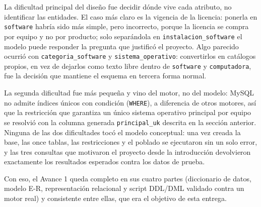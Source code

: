 \documentclass[10pt,a4paper]{article}
\begin{document}
La dificultad principal del diseño fue decidir dónde vive cada atributo, no identificar las entidades. El caso más claro es la vigencia de la licencia: ponerla en \texttt{software} habría sido más simple, pero incorrecto, porque la licencia se compra por equipo y no por producto; solo separándola en \texttt{instalacion\_software} el modelo puede responder la pregunta que justificó el proyecto. Algo parecido ocurrió con \texttt{categoria\_software} y \texttt{sistema\_operativo}: convertirlos en catálogos propios, en vez de dejarlos como texto libre dentro de \texttt{software} y \texttt{computadora}, fue la decisión que mantiene el esquema en tercera forma normal.

La segunda dificultad fue más pequeña y vino del motor, no del modelo: MySQL no admite índices únicos con condición (\texttt{WHERE}), a diferencia de otros motores, así que la restricción que garantiza un único sistema operativo principal por equipo se resolvió con la columna generada \texttt{principal\_uk} descrita en la sección anterior. Ninguna de las dos dificultades tocó el modelo conceptual: una vez creada la base, las once tablas, las restricciones y el poblado se ejecutaron sin un solo error, y las tres consultas que motivaron el proyecto desde la introducción devolvieron exactamente los resultados esperados contra los datos de prueba.

Con eso, el Avance 1 queda completo en sus cuatro partes (diccionario de datos, modelo E-R, representación relacional y script DDL/DML validado contra un motor real) y consistente entre ellas, que era el objetivo de esta entrega.

\pagebreak

\section{\color{colorIPN}{Referencias Bibliográficas}}
\nocite{*}
\color{colorESCOM}{
	\printbibliography[heading=none]
}
\end{document}
